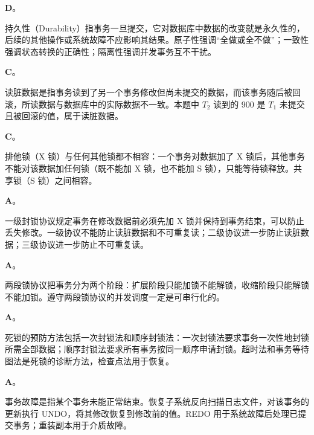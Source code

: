 \documentclass[a4paper,11pt]{article}
\begin{document}


\q \textbf{D}。\begin{analysis}持久性（Durability）指事务一旦提交，它对数据库中数据的改变就是永久性的，后续的其他操作或系统故障不应影响其结果。原子性强调“全做或全不做”；一致性强调状态转换的正确性；隔离性强调并发事务互不干扰。\end{analysis}

\q \textbf{C}。\begin{analysis}读脏数据是指事务读到了另一个事务修改但尚未提交的数据，而该事务随后被回滚，所读数据与数据库中的实际数据不一致。本题中 $T_2$ 读到的 900 是 $T_1$ 未提交且被回滚的值，属于读脏数据。\end{analysis}

\q \textbf{C}。\begin{analysis}排他锁（X 锁）与任何其他锁都不相容：一个事务对数据加了 X 锁后，其他事务不能对该数据加任何锁（既不能加 X 锁，也不能加 S 锁），只能等待锁释放。共享锁（S 锁）之间相容。\end{analysis}

\q \textbf{A}。\begin{analysis}一级封锁协议规定事务在修改数据前必须先加 X 锁并保持到事务结束，可以防止丢失修改。一级协议不能防止读脏数据和不可重复读；二级协议进一步防止读脏数据；三级协议进一步防止不可重复读。\end{analysis}

\q \textbf{A}。\begin{analysis}两段锁协议把事务分为两个阶段：扩展阶段只能加锁不能解锁，收缩阶段只能解锁不能加锁。遵守两段锁协议的并发调度一定是可串行化的。\end{analysis}

\q \textbf{A}。\begin{analysis}死锁的预防方法包括一次封锁法和顺序封锁法：一次封锁法要求事务一次性地封锁所需全部数据；顺序封锁法要求所有事务按同一顺序申请封锁。超时法和事务等待图法是死锁的诊断方法，检查点法用于恢复。\end{analysis}

\q \textbf{A}。\begin{analysis}事务故障是指某个事务未能正常结束。恢复子系统反向扫描日志文件，对该事务的更新执行 UNDO，将其修改恢复到修改前的值。REDO 用于系统故障后处理已提交事务；重装副本用于介质故障。\end{analysis}
\end{document}
